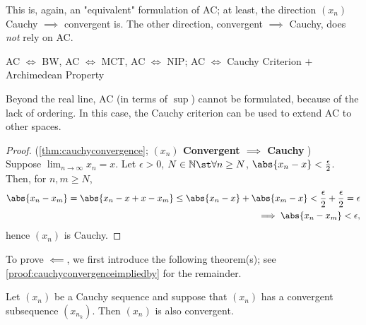 \documentclass[12pt]{article}
\begin{document}
\begin{remark}
  This is, again, an "equivalent" formulation of AC; at least, the direction $(x_n)$ Cauchy $\implies$ convergent is. The other direction, convergent $\implies$ Cauchy, does \textit{not} rely on AC.
\end{remark}

\begin{remark}
  AC $\iff$ BW, AC $\iff$ MCT, AC $\iff$ NIP; AC $\iff$ Cauchy Criterion $+$ Archimedean Property
\end{remark}

\begin{remark}
  Beyond the real line, AC (in terms of $\sup$) cannot be formulated, because of the lack of ordering. In this case, the Cauchy criterion can be used to extend AC to other spaces.
\end{remark}

\begin{proof}(\cref{thm:cauchyconvergence}; 
  \textbf{$(x_n)$ Convergent $\implies$ Cauchy }) \\Suppose $\lim_{n\to\infty} x_n = x$. Let $\epsilon >0$, $N \in \mathbb{N} \st \forall n \geq N$, $\abs{x_n - x} < \frac{\epsilon}{2}$. Then, for $n,m \geq N$,
  \begin{align*}
    \abs{x_n - x_m} = \abs{x_n - x + x - x_m} \leq \abs{x_n - x} + \abs{x_m - x} < \frac{\epsilon}{2} + \frac{\epsilon}{2} = \epsilon\\
    \implies \abs{x_n - x_m} < \epsilon,
  \end{align*}
  hence $(x_n)$ is Cauchy.
\end{proof}
\begin{remark}
  To prove $\impliedby$, we first introduce the following theorem(s); see \cref{proof:cauchyconvergenceimpliedby} for the remainder.
\end{remark}

\begin{theorem}\label{thm:cauchysubsequence}
  Let $(x_n)$ be a Cauchy sequence and suppose that $(x_n)$ has a convergent subsequence $(x_{n_k})$. Then $(x_n)$ is also convergent.
\end{theorem}
\end{document}
